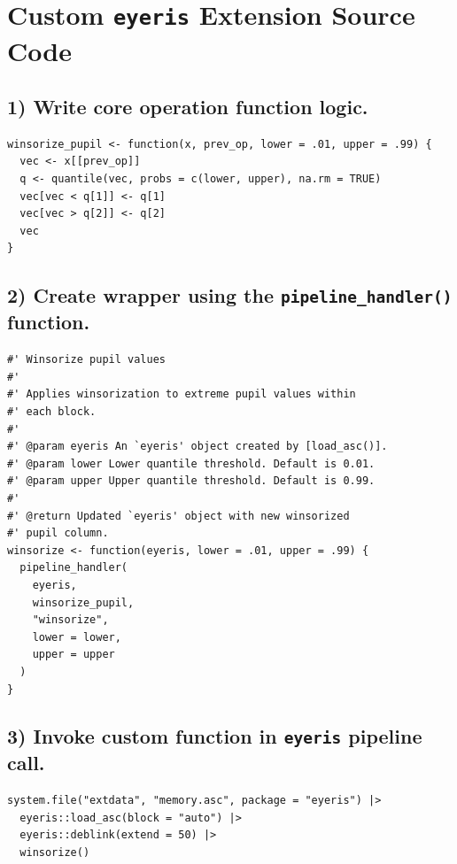 \chapter{Custom \texttt{eyeris} Extension Source Code}\label{app:custom-extensions}

\section*{1) Write core operation function logic.}
\begin{lstlisting}
winsorize_pupil <- function(x, prev_op, lower = .01, upper = .99) {
  vec <- x[[prev_op]]
  q <- quantile(vec, probs = c(lower, upper), na.rm = TRUE)
  vec[vec < q[1]] <- q[1]
  vec[vec > q[2]] <- q[2]
  vec
}
\end{lstlisting}

\section*{2) Create wrapper using the \texttt{pipeline\_handler()} function.}
\begin{lstlisting}
#' Winsorize pupil values
#'
#' Applies winsorization to extreme pupil values within
#' each block.
#'
#' @param eyeris An `eyeris' object created by [load_asc()].
#' @param lower Lower quantile threshold. Default is 0.01.
#' @param upper Upper quantile threshold. Default is 0.99.
#'
#' @return Updated `eyeris' object with new winsorized
#' pupil column.
winsorize <- function(eyeris, lower = .01, upper = .99) {
  pipeline_handler(
    eyeris,
    winsorize_pupil,
    "winsorize",
    lower = lower,
    upper = upper
  )
}
\end{lstlisting}

\section*{3) Invoke custom function in \texttt{eyeris} pipeline call.}
\begin{lstlisting}
system.file("extdata", "memory.asc", package = "eyeris") |>
  eyeris::load_asc(block = "auto") |>
  eyeris::deblink(extend = 50) |>
  winsorize()
\end{lstlisting}
